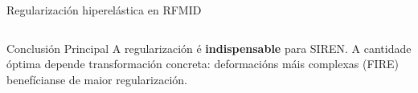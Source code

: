 \documentclass[xcolor=dvipsnames]{beamer}
\begin{document}
\begin{frame}
\begin{columns}[T]
\begin{column}{0.35\textwidth}
            \small{Regularización hiperelástica en RFMID}
        \end{column}
    \end{columns}
    
    \vspace{0.2cm}
    
    \begin{alertblock}{Conclusión Principal}
        A regularización é \textbf{indispensable} para SIREN. A cantidade óptima depende transformación concreta: deformacións máis complexas (FIRE) benefícianse de maior regularización.
    \end{alertblock}
    
\end{frame}
\end{document}
